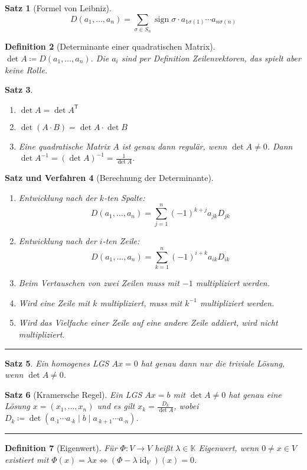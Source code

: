 \documentclass[a4paper]{article}
\newcounter{Sec}
\theoremstyle{marginbreak}
\newtheorem{definition}{Definition}[Sec]
\newtheorem{satz}[definition]{Satz}
\newtheorem{satzver}[definition]{Satz und Verfahren}
\DeclareMathOperator{\id}{id}
\DeclareMathOperator{\sign}{sign}
\newcommand{\sep}{%
	\rule{\textwidth}{0.3pt}%
	\stepcounter{Sec}%
	}
\begin{document}
	\begin{satz}[Formel von Leibniz]
		\[ D(a_1,\ldots,a_n) = \sum_{\sigma\in S_n}\sign\sigma\cdot a_{1\sigma(1)}\cdots a_{n\sigma(n)} \]
	\end{satz}
	\begin{definition}[Determinante einer quadratischen Matrix]
		$\det A\coloneqq D(a_1,\ldots,a_n)$. Die $a_i$ sind per Definition Zeilenvektoren, das spielt aber keine Rolle.
	\end{definition}
	\begin{satz}
		\begin{enumerate}[label=(\alph*)]
			\item $\det A = \det A^{\mathsf{T}}$
			\item $\det(A\cdot B) = \det A\cdot \det B$
			\item Eine quadratische Matrix $A$ ist genau dann regulär, wenn $\det A\neq 0$. Dann $\det A^{-1} = (\det A)^{-1} = \frac{1}{\det A}$.
		\end{enumerate}
	\end{satz}
	\begin{satzver}[Berechnung der Determinante]
		\begin{enumerate}[label=(\alph*)]
			\item Entwicklung nach der $k$-ten Spalte:
				\[ D(a_1,\ldots,a_n) = \sum_{j=1}^n(-1)^{k+j}a_{jk}D_{jk} \]
			\item Entwicklung nach der $i$-ten Zeile:
				\[ D(a_1,\ldots,a_n) = \sum_{k=1}^n(-1)^{i+k}a_{ik}D_{ik} \]
			\item Beim Vertauschen von zwei Zeilen muss mit $-1$ multipliziert werden.
			\item Wird eine Zeile mit $k$ multipliziert, muss mit $k^{-1}$ multipliziert werden.
			\item Wird das Vielfache einer Zeile auf eine andere Zeile addiert, wird nicht multipliziert.
		\end{enumerate}
	\end{satzver}
	\sep
	\begin{satz}
		Ein homogenes LGS $Ax=0$ hat genau dann nur die triviale Lösung, wenn $\det A\neq0$.
	\end{satz}
	\begin{satz}[Kramersche Regel]
		Ein LGS $Ax=b$ mit $\det A\neq 0$ hat genau eine Lösung $x = (x_1,\ldots,x_n)$ und es gilt
		$x_k = \frac{D_k}{\det A}$, wobei $D_k\coloneqq\det(a_{\cdot1}\cdots a_{\cdot k} \mid b \mid a_{\cdot k+1}\cdots a_{\cdot n})$.
	\end{satz}
	\sep
	\begin{definition}[Eigenwert]
		Für $\Phi\colon V\to V$ heißt $\lambda\in\mathbb{K}$ Eigenwert, wenn $0\neq x\in V$
		existiert mit $\Phi(x)=\lambda x \iff (\Phi-\lambda\id_V)(x)=0$.
	\end{definition}
\end{document}
